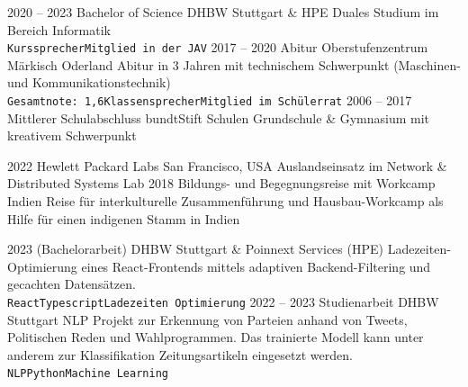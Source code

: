 \documentclass[9pt]{developercv} %
\begin{document}

\begin{entrylist}
	\entry
	{2020 -- 2023}
	{Bachelor of Science}
	{DHBW Stuttgart \& HPE}
	{Duales Studium im Bereich Informatik\\ \texttt{Kurssprecher}\slashsep\texttt{Mitglied in der JAV}}
	\entry
	{2017 -- 2020}
	{Abitur}
	{Oberstufenzentrum Märkisch Oderland}
	{Abitur in 3 Jahren mit technischem Schwerpunkt (Maschinen- und Kommunikationstechnik)\\ \texttt{Gesamtnote: 1,6}\slashsep\texttt{Klassensprecher}\slashsep\texttt{Mitglied im Schülerrat}}
	\entry
	{2006 -- 2017}
	{Mittlerer Schulabschluss}
	{bundtStift Schulen}
	{Grundschule \& Gymnasium mit kreativem Schwerpunkt}
\end{entrylist}



\begin{entrylist}
	\entry
	{2022}
	{Hewlett Packard Labs}
	{San Francisco, USA}
	{Auslandseinsatz im Network \& Distributed Systems Lab}
	\entry
	{2018}
	{Bildungs- und Begegnungsreise mit Workcamp}
	{Indien}
	{Reise für interkulturelle Zusammenführung und Hausbau-Workcamp als Hilfe für einen indigenen Stamm in Indien}
\end{entrylist}



\begin{entrylist}
  \entry
	{2023}
	{(Bachelorarbeit)}
	{DHBW Stuttgart \& Poinnext Services (HPE)}
	{Ladezeiten-Optimierung eines React-Frontends mittels adaptiven Backend-Filtering und gecachten Datensätzen.\\ \texttt{React}\slashsep\texttt{Typescript}\slashsep\texttt{Ladezeiten Optimierung}}
	\entry
	{2022 --  2023}
	{Studienarbeit}
	{DHBW Stuttgart}
	{NLP Projekt zur Erkennung von Parteien anhand von Tweets, Politischen Reden und Wahlprogrammen. Das trainierte Modell kann unter anderem zur Klassifikation Zeitungsartikeln eingesetzt werden.\\ \texttt{NLP}\slashsep\texttt{Python}\slashsep\texttt{Machine Learning}}
\end{entrylist}
\end{document}
